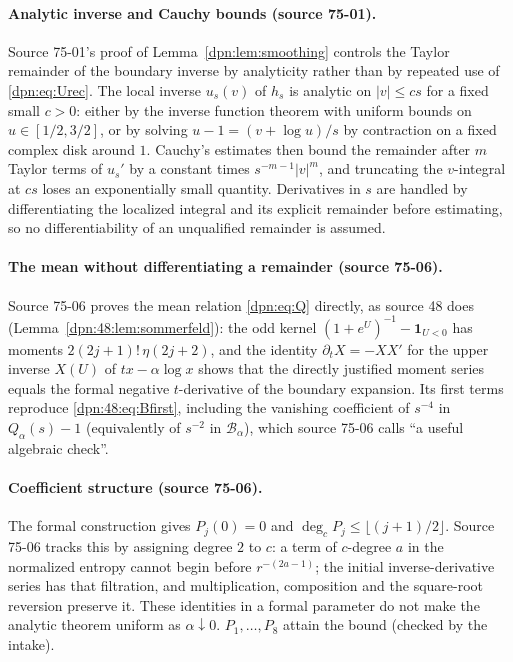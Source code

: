 \documentclass[11pt]{article}
\numberwithin{equation}{section}
\theoremstyle{definition}\newtheorem{definition}[theorem]{Definition}
\theoremstyle{remark}\newtheorem{remark}[theorem]{Remark}
\newcommand{\src}[1]{\textup{(source #1)}}
\newcommand{\Bop}{\mathcal B_\alpha}
\newcommand{\ind}{\mathbf 1}
\begin{document}
\paragraph{Analytic inverse and Cauchy bounds \src{75-01}.}
Source 75-01's proof of Lemma~\ref{dpn:lem:smoothing} controls the Taylor
remainder of the boundary inverse by analyticity rather than by repeated use
of \eqref{dpn:eq:Urec}.  The local inverse $u_s(v)$ of $h_s$ is analytic on
$|v|\le cs$ for a fixed small $c>0$: either by the inverse function theorem with
uniform bounds on $u\in[1/2,3/2]$, or by solving $u-1=(v+\log u)/s$ by
contraction on a fixed complex disk around $1$.  Cauchy's estimates then bound
the remainder after $m$ Taylor terms of $u_s'$ by a constant times
$s^{-m-1}|v|^m$, and truncating the $v$-integral at $cs$ loses an
exponentially small quantity.  Derivatives in $s$ are handled by
differentiating the localized integral and its explicit remainder before
estimating, so no differentiability of an unqualified remainder is assumed.

\paragraph{The mean without differentiating a remainder \src{75-06}.}
Source 75-06 proves the mean relation \eqref{dpn:eq:Q} directly, as source 48
does (Lemma~\ref{dpn:48:lem:sommerfeld}): the odd kernel
$(1+e^U)^{-1}-\ind_{U<0}$ has moments $2(2j+1)!\,\eta(2j+2)$, and the identity
$\partial_tX=-XX'$ for the upper inverse $X(U)$ of $tx-\alpha\log x$ shows that
the directly justified moment series equals the formal negative $t$-derivative
of the boundary expansion.  Its first terms reproduce
\eqref{dpn:48:eq:Bfirst}, including the vanishing coefficient of $s^{-4}$ in
$Q_\alpha(s)-1$ (equivalently of $s^{-2}$ in $\Bop$), which source 75-06 calls
``a useful algebraic check''.

\paragraph{Coefficient structure \src{75-06}.}
The formal construction gives $P_j(0)=0$ and
$\deg_cP_j\le\lfloor(j+1)/2\rfloor$.  Source 75-06 tracks this by assigning
degree $2$ to $c$: a term of $c$-degree $a$ in the normalized entropy cannot
begin before $r^{-(2a-1)}$; the initial inverse-derivative series has that
filtration, and multiplication, composition and the square-root reversion
preserve it.  These identities in a formal parameter do not make the analytic
theorem uniform as $\alpha\downarrow0$.  $P_1,\dots,P_8$ attain the bound
(checked by the intake).
\end{document}
